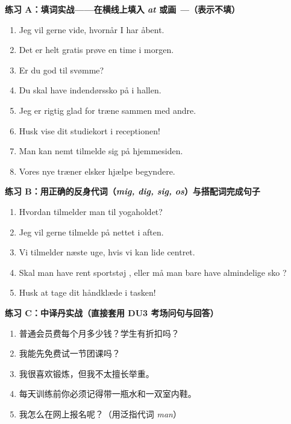\textbf{练习 A：填词实战——在横线上填入 \textit{at} 或画 \textit{---}（表示不填）}
\begin{enumerate}
  \item Jeg vil gerne \underline{\hspace{1.2cm}} vide, hvornår I har åbent.
  \item Det er helt gratis \underline{\hspace{1.2cm}} prøve en time i morgen.
  \item Er du god til \underline{\hspace{1.2cm}} svømme?
  \item Du skal \underline{\hspace{1.2cm}} have indendørssko på i hallen.
  \item Jeg er rigtig glad for \underline{\hspace{1.2cm}} træne sammen med andre.
  \item Husk \underline{\hspace{1.2cm}} vise dit studiekort i receptionen!
  \item Man kan nemt \underline{\hspace{1.2cm}} tilmelde sig på hjemmesiden.
  \item Vores nye træner elsker \underline{\hspace{1.2cm}} hjælpe begyndere.
\end{enumerate}

\textbf{练习 B：用正确的反身代词（\textit{mig, dig, sig, os}）与搭配词完成句子}
\begin{enumerate}
  \item Hvordan tilmelder man \underline{\hspace{1.4cm}} til yogaholdet?
  \item Jeg vil gerne tilmelde \underline{\hspace{1.4cm}} på nettet i aften.
  \item Vi tilmelder \underline{\hspace{1.4cm}} næste uge, hvis vi kan lide centret.
  \item Skal man have rent sportstøj \underline{\hspace{1.2cm}}, eller må man bare have almindelige sko \underline{\hspace{1.2cm}}?
  \item Husk at tage dit håndklæde \underline{\hspace{1.2cm}} i tasken!
\end{enumerate}

\textbf{练习 C：中译丹实战（直接套用 DU3 考场问句与回答）}
\begin{enumerate}
  \item 普通会员费每个月多少钱？学生有折扣吗？
  \item 我能先免费试一节团课吗？
  \item 我很喜欢锻炼，但我不太擅长举重。
  \item 每天训练前你必须记得带一瓶水和一双室内鞋。
  \item 我怎么在网上报名呢？（用泛指代词 \textit{man}）
\end{enumerate}

